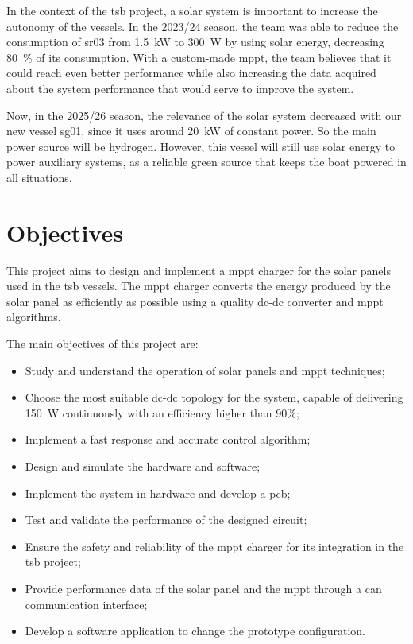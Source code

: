 In the context of the \ac{tsb} project, a solar system is important to increase the autonomy of the vessels. In the 2023/24 season, the team was able to reduce the consumption of \ac{sr03} from 1.5~kW to 300~W by using solar energy, decreasing 80~\% of its consumption. With a custom-made \ac{mppt}, the team believes that it could reach even better performance while also increasing the data acquired about the system performance that would serve to improve the system.

Now, in the 2025/26 season, the relevance of the solar system decreased with our new vessel \ac{sg01}, since it uses around 20~kW of constant power. So the main power source will be hydrogen. However, this vessel will still use solar energy to power auxiliary systems, as a reliable green source that keeps the boat powered in all situations.

\section{Objectives} 

This project aims to design and implement a \ac{mppt} charger for the solar panels used in the \ac{tsb} vessels. The \ac{mppt} charger converts the energy produced by the solar panel as efficiently as possible using a quality \acs{dc}-\acs{dc} converter and \ac{mppt} algorithms.

The main objectives of this project are:

\begin{itemize}[leftmargin=4em, itemsep=1pt, topsep=2pt]
    \item Study and understand the operation of solar panels and \ac{mppt} techniques;
    \item Choose the most suitable \acs{dc}-\acs{dc} topology for the system, capable of delivering 150~W continuously with an efficiency higher than 90\%;
    \item Implement a fast response and accurate control algorithm;
    \item Design and simulate the hardware and software;
    \item Implement the system in hardware and develop a \ac{pcb};
    \item Test and validate the performance of the designed circuit;
    \item Ensure the safety and reliability of the \ac{mppt} charger for its integration in the \ac{tsb} project;
    \item Provide performance data of the solar panel and the \ac{mppt} through a \ac{can} communication interface;
    \item Develop a software application to change the prototype configuration.
\end{itemize} 

